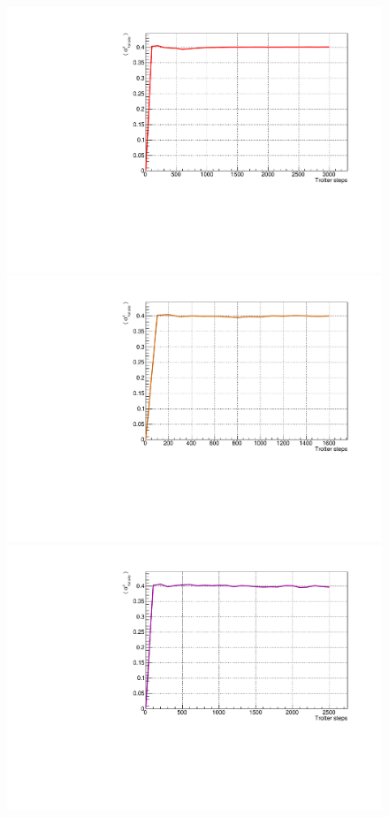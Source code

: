 \begin{figure}[H]
\centering
    \includegraphics[scale=0.5]{Figures/convergence/Convergence_s8T3000J1051.pdf}
    \includegraphics[scale=0.5]{Figures/convergence/Convergence_LM_L012_m060_Time001600_J1051.pdf}
    \includegraphics[scale=0.5]{Figures/convergence/ConvergenceLM_L016_m080_Time002500_J1051.pdf}

\end{figure}
